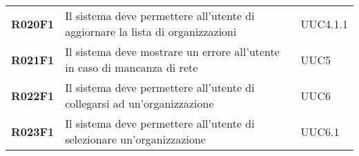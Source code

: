 \documentclass[../analisi-dei-requisiti]{subfiles}
\begin{document}
\begin{longtable}[H]{>{\centering\bfseries}m{3cm} >{\centering}m{10cm} >{\centering\arraybackslash}m{3cm}}
  R020F1                  & Il sistema deve permettere all'utente di aggiornare la lista di organizzazioni                                    & UUC4.1.1                      \\
  R021F1                  & Il sistema deve mostrare un errore all'utente in caso di mancanza di rete                                         & UUC5                          \\
  R022F1                  & Il sistema deve permettere all'utente di collegarsi ad un'organizzazione                                          & UUC6                          \\
  R023F1                  & Il sistema deve permettere all'utente di selezionare un'organizzazione                                            & UUC6.1                        \\
\end{longtable}

\end{document}
